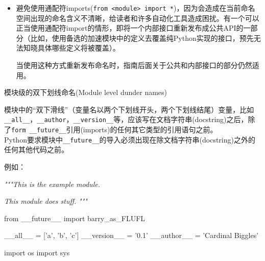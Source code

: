 \documentclass[ignorenonframetext,9pt]{beamer}
\newenvironment{Shaded}{}{}
\newcommand{\CommentTok}[1]{\textcolor[rgb]{0.38,0.63,0.69}{\textit{#1}}}
\newcommand{\ImportTok}[1]{#1}
\newcommand{\NormalTok}[1]{#1}
\newcommand{\OperatorTok}[1]{\textcolor[rgb]{0.40,0.40,0.40}{#1}}
\newcommand{\StringTok}[1]{\textcolor[rgb]{0.25,0.44,0.63}{#1}}
\begin{document}
\begin{frame}[fragile]

\begin{itemize}
\item
  避免使用通配符imports(\texttt{from\ \textless{}module\textgreater{}\ import\ *})，因为会造成在当前命名空间出现的命名含义不清晰，给读者和许多自动化工具造成困扰。有一个可以正当使用通配符import的情形，即将一个内部接口重新发布成公共API的一部分（比如，使用备选的加速模块中的定义去覆盖纯Python实现的接口，预先无法知晓具体哪些定义将被覆盖）。

  当使用这种方式重新发布命名时，指南后面关于公共和内部接口的部分仍然适用。
\end{itemize}

\end{frame}

\begin{frame}[fragile]{模块级的双下划线命名(Module level dunder names)}

\begin{block}

模块中的``双下滑线''（变量名以两个下划线开头，两个下划线结尾）变量，比如\texttt{\_\_all\_\_}，\texttt{\_\_author}，\texttt{\_\_version\_\_}等，应该写在文档字符串(docstring)之后，除了\texttt{form\ \_\_future\_\_}引用(imports)的任何其它类型的引用语句之前。\\
Python要求模块中\texttt{\_\_future\_\_}的导入必须出现在除文档字符串(docstring)之外的任何其他代码之前。

\end{block}
\end{frame}

\begin{frame}[fragile]
\begin{block}{}
例如：

\begin{Shaded}
\begin{Highlighting}[]
\CommentTok{"""This is the example module.}

\CommentTok{This module does stuff.}
\CommentTok{"""}

\ImportTok{from}\NormalTok{ __future__ }\ImportTok{import}\NormalTok{ barry_as_FLUFL}

\NormalTok{__all__ }\OperatorTok{=}\NormalTok{ [}\StringTok{'a'}\NormalTok{, }\StringTok{'b'}\NormalTok{, }\StringTok{'c'}\NormalTok{]}
\NormalTok{__version__ }\OperatorTok{=} \StringTok{'0.1'}
\NormalTok{__author__ }\OperatorTok{=} \StringTok{'Cardinal Biggles'}

\ImportTok{import}\NormalTok{ os}
\ImportTok{import}\NormalTok{ sys}
\end{Highlighting}
\end{Shaded}

\end{block}

\end{frame}
\end{document}
